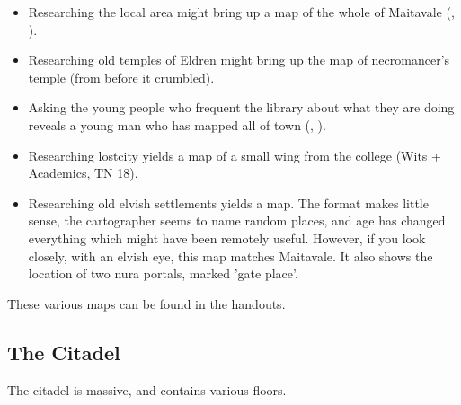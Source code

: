 \begin{itemize}

  \item
  Researching the local area might bring up a map of the whole of Maitavale (, \tn[14]).
  \item
  Researching old temples of Eldren might bring up the map of \gls{necromancer}'s temple (from before it crumbled).
  \item
  Asking the young people who frequent the library about what they are doing reveals a young man who has mapped all of \gls{town} (, \tn[10]).
  \item
  Researching \gls{lostcity} yields a map of a small wing from the \gls{college} (Wits + Academics, TN 18).
  \item
  Researching old elvish settlements yields a map.
  The format makes little sense, the cartographer seems to name random places, and age has changed everything which might have been remotely useful.
  However, if you look closely, with an elvish eye, this map matches Maitavale.
  It also shows the location of two nura portals, marked 'gate place'.

\end{itemize}

These various maps can be found in the handouts.

\subsection{The Citadel}
\label{citadel}

The citadel is massive, and contains various floors.

